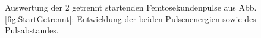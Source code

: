 \documentclass[bachelor,       %
               twoside,        %
               BCOR10mm,       %
               liststotoc,nomtotoc,bibtotoc, %
               english,ngerman, %
               final,          %
               ]{GAUBM}
\begin{document}
\begin{figure}[!htb]
   \centering
   \hfill
   \caption{Auswertung der 2 getrennt startenden Femtosekundenpulse aus Abb. \ref{fig:StartGetrennt}: Entwicklung der beiden Pulsenenergien sowie des Pulsabstandes.}
   \label{fig:StartGetrenntAusw}
\end{figure}
\end{document}

